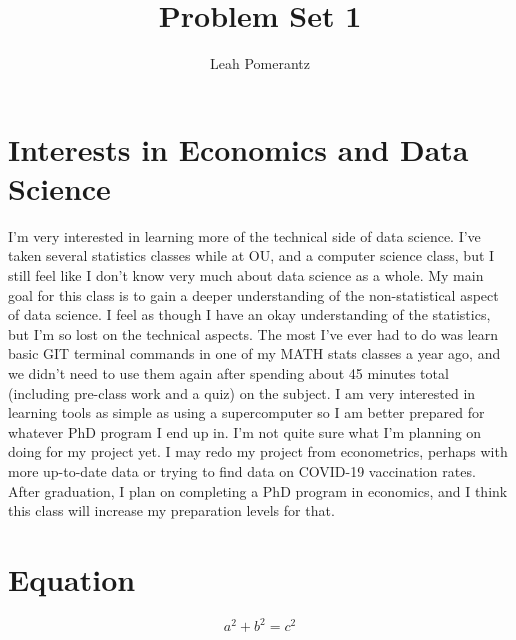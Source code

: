 \documentclass{article}
\title{Problem Set 1}
\author{Leah Pomerantz}
\begin{document}
\maketitle


\section{Interests in Economics and Data Science}

I'm very interested in learning more of the technical side of data science. I've taken several statistics classes while at OU, and a computer science class, but I still feel like I don't know very much about data science as a whole. My main goal for this class is to gain a deeper understanding of the non-statistical aspect of data science.  I feel as though I have an okay understanding of the statistics, but I'm so lost on the technical aspects. The most I've ever had to do was learn basic GIT terminal commands in one of my MATH stats classes a year ago, and we didn't need to use them again after spending about 45 minutes total (including pre-class work and a quiz) on the subject. I am very interested in learning tools as simple as using a supercomputer so I am better prepared for whatever PhD program I end up in.  I'm not quite sure what I'm planning on doing for my project yet. I may redo my project from econometrics, perhaps with more up-to-date data or trying to find data on COVID-19 vaccination rates.  After graduation, I plan on completing a PhD program in economics, and I think this class will increase my preparation levels for that. 

\section{Equation}

\begin{equation*}
    a^2 + b^2 = c^2
\end{equation*}
\end{document}
